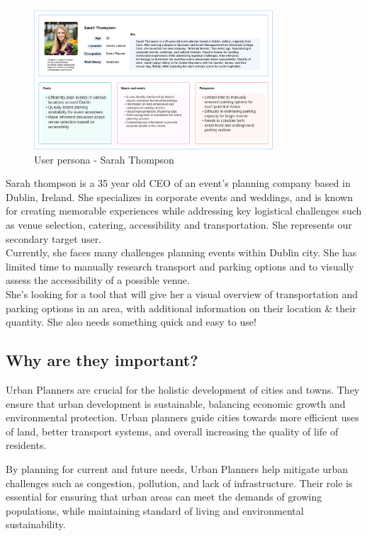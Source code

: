 \begin{figure}[h!]
    \centering
    \includegraphics[width=0.8\textwidth]{images/sarah-thompson-userpersona.png}
    \caption{User persona - Sarah Thompson}
\end{figure}
Sarah thompson is a 35 year old CEO of an event's planning company based in Dublin, Ireland. She specializes in corporate events and weddings, and is known for creating memorable experiences while addressing key logistical challenges such as venue selection, catering, accessibility and transportation. She represents our secondary target user.\\
Currently, she faces many challenges planning events within Dublin city. She has limited time to manually research transport and parking options and to visually assess the accessibility of a possible venue.\\
She's looking for a tool that will give her a visual overview of transportation and parking options in an area, with additional information on their location  \& their quantity. She also needs something quick and easy to use!

\subsection{Why are they important?}
Urban Planners are crucial for the holistic development of cities and towns.
They ensure that urban development is sustainable, balancing economic growth and
environmental protection. Urban planners guide cities towards more efficient
uses of land, better transport systems, and overall increasing the quality of
life of residents.

By planning for current and future needs, Urban Planners help mitigate urban
challenges such as congestion, pollution, and lack of infrastructure. Their role
is essential for ensuring that urban areas can meet the demands of growing
populations, while maintaining standard of living and environmental
sustainability.


